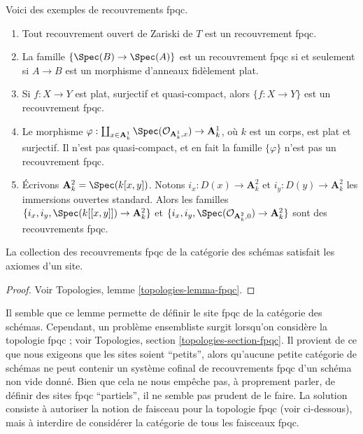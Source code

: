 \begin{example}
\label{example-fpqc-coverings}
Voici des exemples de recouvrements fpqc.
\begin{enumerate}
\item Tout recouvrement ouvert de Zariski de $T$ est un recouvrement fpqc.
\item La famille $\{\Spec(B) \to \Spec(A)\}$ est un recouvrement fpqc
si et seulement si $A \to B$ est un morphisme d'anneaux fid\`element plat.
\item Si $f: X \to Y$ est plat, surjectif et quasi-compact, alors $\{ f: X\to
Y\}$ est un recouvrement fpqc.
\item Le morphisme
$\varphi :
\coprod_{x \in \mathbf{A}^1_k} \Spec(\mathcal{O}_{\mathbf{A}^1_k, x})
\to \mathbf{A}^1_k$,
o\`u $k$ est un corps, est plat et surjectif. Il n'est pas quasi-compact, et
en fait la famille $\{\varphi\}$ n'est pas un recouvrement fpqc.
\item \'Ecrivons
$\mathbf{A}^2_k = \Spec(k[x, y])$. Notons $i_x : D(x) \to \mathbf{A}^2_k$
et $i_y : D(y) \to \mathbf{A}^2_k$ les immersions ouvertes standard.
Alors les familles
$\{i_x, i_y, \Spec(k[[x, y]]) \to \mathbf{A}^2_k\}$
et
$\{i_x, i_y, \Spec(\mathcal{O}_{\mathbf{A}^2_k, 0}) \to \mathbf{A}^2_k\}$
sont des recouvrements fpqc.
\end{enumerate}
\end{example}

\begin{lemma}
\label{lemma-site-fpqc}
La collection des recouvrements fpqc de la cat\'egorie des sch\'emas
satisfait les axiomes d'un site.
\end{lemma}

\begin{proof}
Voir Topologies, lemme \ref{topologies-lemma-fpqc}.
\end{proof}

\noindent
Il semble que ce lemme permette de d\'efinir le site fpqc de la cat\'egorie
des sch\'emas. Cependant, un probl\`eme ensembliste surgit lorsqu'on
consid\`ere la topologie fpqc ; voir
Topologies, section \ref{topologies-section-fpqc}.
Il provient de ce que nous exigeons que les sites soient ``petits'', alors qu'aucune
petite cat\'egorie de sch\'emas ne peut contenir un syst\`eme cofinal de recouvrements fpqc d'un
sch\'ema non vide donn\'e. Bien que cela ne nous emp\^eche pas, \`a proprement parler,
de d\'efinir des sites fpqc ``partiels'',
il ne semble pas prudent de le faire. La solution consiste \`a autoriser
la notion de faisceau pour la topologie fpqc (voir ci-dessous), mais \`a interdire de
consid\'erer la cat\'egorie de tous les faisceaux fpqc.

